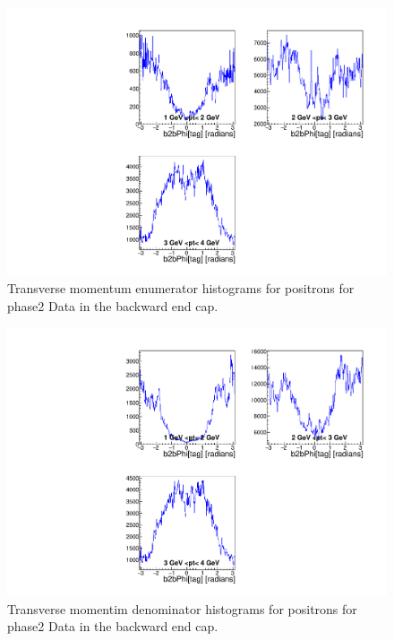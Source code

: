 \documentclass[a4paper,11pt,twosided,final,german,openbib,pdftex,listof=totoc,bibliography=totoc]{scrbook}
\begin{document}
\begin{appendix}
\begin{figure}[!htbp]
	\centering
	\includegraphics[width=\textwidth]{Plots/master/xPtMPhiepECE_Data}
	\caption[Transverse Momentum $\phi$ Positron Backward End Cap Enumerator Histogram Phase2 Data]{Transverse momentum enumerator histograms for positrons for phase2 Data in the backward end cap.}
	\label{plt:PtMPhiepECE_Data}
\end{figure}

\begin{figure}[!htbp]
	\centering
	\includegraphics[width=\textwidth]{Plots/master/xPtMPhiepECD_Data}
	\caption[Transverse Momentum $\phi$ Positron Backward End Cap Denominator Histogram Phase2 Data]{Transverse momentim denominator histograms for positrons for phase2 Data in the backward end cap.}
	\label{plt:PtMPhiepECD_Data}
\end{figure}












\end{appendix}
\end{document}

